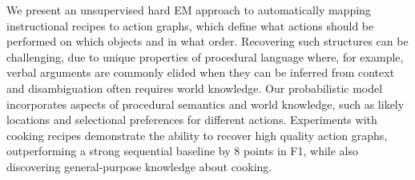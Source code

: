 We present an unsupervised hard EM approach to automatically mapping instructional recipes to action graphs, which define what actions should be performed on which objects and in what order. Recovering such structures can be challenging, due to unique properties of procedural language where, for example, verbal arguments are commonly elided when they can be inferred from context and disambiguation often requires world knowledge. Our probabilistic model incorporates aspects of procedural semantics and world knowledge, such as likely locations and selectional preferences for different actions. Experiments with cooking recipes demonstrate the ability to recover high quality action graphs, outperforming a strong sequential baseline by 8 points in F1, while also discovering general-purpose knowledge about cooking.
